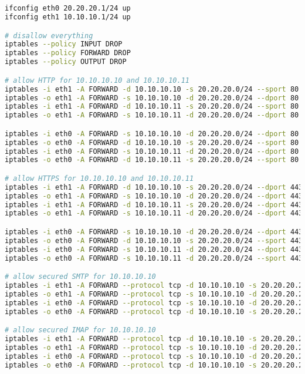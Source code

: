\documentclass[12pt, a4paper]{article}
\begin{document}
\section{} %
\begin{lstlisting}[language=bash]
ifconfig eth0 20.20.20.1/24 up
ifconfig eth1 10.10.10.1/24 up

# disallow everything
iptables --policy INPUT DROP
iptables --policy FORWARD DROP
iptables --policy OUTPUT DROP

# allow HTTP for 10.10.10.10 and 10.10.10.11
iptables -i eth1 -A FORWARD -d 10.10.10.10 -s 20.20.20.0/24 --sport 80 -j ACCEPT
iptables -o eth1 -A FORWARD -s 10.10.10.10 -d 20.20.20.0/24 --dport 80 -j ACCEPT
iptables -i eth1 -A FORWARD -d 10.10.10.11 -s 20.20.20.0/24 --sport 80 -j ACCEPT
iptables -o eth1 -A FORWARD -s 10.10.10.11 -d 20.20.20.0/24 --dport 80 -j ACCEPT

iptables -i eth0 -A FORWARD -s 10.10.10.10 -d 20.20.20.0/24 --dport 80 -j ACCEPT
iptables -o eth0 -A FORWARD -d 10.10.10.10 -s 20.20.20.0/24 --sport 80 -j ACCEPT
iptables -i eth0 -A FORWARD -s 10.10.10.11 -d 20.20.20.0/24 --dport 80 -j ACCEPT
iptables -o eth0 -A FORWARD -d 10.10.10.11 -s 20.20.20.0/24 --sport 80 -j ACCEPT

# allow HTTPS for 10.10.10.10 and 10.10.10.11
iptables -i eth1 -A FORWARD -d 10.10.10.10 -s 20.20.20.0/24 --dport 443 -j ACCEPT
iptables -o eth1 -A FORWARD -s 10.10.10.10 -d 20.20.20.0/24 --dport 443 -j ACCEPT
iptables -i eth1 -A FORWARD -d 10.10.10.11 -s 20.20.20.0/24 --dport 443 -j ACCEPT
iptables -o eth1 -A FORWARD -s 10.10.10.11 -d 20.20.20.0/24 --dport 443 -j ACCEPT

iptables -i eth0 -A FORWARD -s 10.10.10.10 -d 20.20.20.0/24 --dport 443 -j ACCEPT
iptables -o eth0 -A FORWARD -d 10.10.10.10 -s 20.20.20.0/24 --sport 443 -j ACCEPT
iptables -i eth0 -A FORWARD -s 10.10.10.11 -d 20.20.20.0/24 --dport 443 -j ACCEPT
iptables -o eth0 -A FORWARD -s 10.10.10.11 -d 20.20.20.0/24 --sport 443 -j ACCEPT

# allow secured SMTP for 10.10.10.10
iptables -i eth1 -A FORWARD --protocol tcp -d 10.10.10.10 -s 20.20.20.20.11 --sport 465 --jump ACCEPT
iptables -o eth1 -A FORWARD --protocol tcp -s 10.10.10.10 -d 20.20.20.20.11 --dport 465 --jump ACCEPT
iptables -i eth0 -A FORWARD --protocol tcp -s 10.10.10.10 -d 20.20.20.20.11 --dport 465 --jump ACCEPT
iptables -o eth0 -A FORWARD --protocol tcp -d 10.10.10.10 -s 20.20.20.20.11 --sport 465 --jump ACCEPT

# allow secured IMAP for 10.10.10.10
iptables -i eth1 -A FORWARD --protocol tcp -d 10.10.10.10 -s 20.20.20.20.11 --sport 993 --jump ACCEPT
iptables -o eth1 -A FORWARD --protocol tcp -s 10.10.10.10 -d 20.20.20.20.11 --dport 993 --jump ACCEPT
iptables -i eth0 -A FORWARD --protocol tcp -s 10.10.10.10 -d 20.20.20.20.11 --dport 993 --jump ACCEPT
iptables -o eth0 -A FORWARD --protocol tcp -d 10.10.10.10 -s 20.20.20.20.11 --sport 993 --jump ACCEPT
\end{lstlisting}
\end{document}
